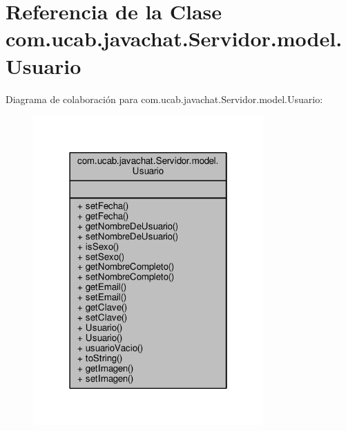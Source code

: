 \hypertarget{classcom_1_1ucab_1_1javachat_1_1_servidor_1_1model_1_1_usuario}{\section{Referencia de la Clase com.\-ucab.\-javachat.\-Servidor.\-model.\-Usuario}
\label{classcom_1_1ucab_1_1javachat_1_1_servidor_1_1model_1_1_usuario}
}


Diagrama de colaboración para com.\-ucab.\-javachat.\-Servidor.\-model.\-Usuario\-:\nopagebreak
\begin{figure}[H]
\begin{center}
\leavevmode
\includegraphics[width=250pt]{classcom_1_1ucab_1_1javachat_1_1_servidor_1_1model_1_1_usuario__coll__graph}
\end{center}
\end{figure}
